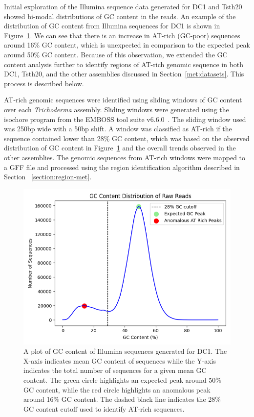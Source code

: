 Initial exploration of the Illumina sequence data generated for DC1
and Tsth20 showed bi-modal distributions of GC content in the
reads. An example of the distribution of GC content from Illumina sequences for DC1 is shown in Figure~\ref{fig:dc1-low-gc}. We can see that there is an increase in AT-rich (GC-poor) sequences around 16\% GC content, which is unexpected in comparison to the expected peak around 50\% GC content. Because of this observation, we extended the GC content analysis further to identify
 regions of AT-rich genomic sequence in both DC1, Tsth20, and the other assemblies discussed in Section~\ref{met:datasets}. This process is described below.
 
AT-rich genomic sequences were identified using sliding windows of GC
content over each \textit{Trichoderma} assembly. Sliding windows were
generated using the isochore program from the EMBOSS tool suite
v6.6.0~\cite{rice2000a}. The sliding window used was 250bp wide with a
50bp shift. A window was classified as AT-rich if the sequence
contained lower than 28\% GC content, which was based on the observed distribution of GC content in Figure~\ref{fig:dc1-low-gc} and the overall trends observed in the other assemblies. The genomic sequences from
AT-rich windows were mapped to a GFF file and processed using the
region identification algorithm described in Section
~\ref{section:region-met}.

\begin{figure}
  \centering
  \includegraphics[width=\textwidth]{figures/raw-dc1-gc-plot.png}
  \caption[GC content distribution for DC1]{A plot of GC content of Illumina sequences generated for
    DC1. The X-axis indicates mean GC content of sequences while the
    Y-axis indicates the total number of sequences for a given mean GC
    content. The green circle highlights an expected peak around 50\% GC content, while the red circle highlights an anomalous peak around 16\% GC content. The dashed black line indicates the 28\% GC content cutoff used to identify AT-rich sequences.}\label{fig:dc1-low-gc}
\end{figure}



